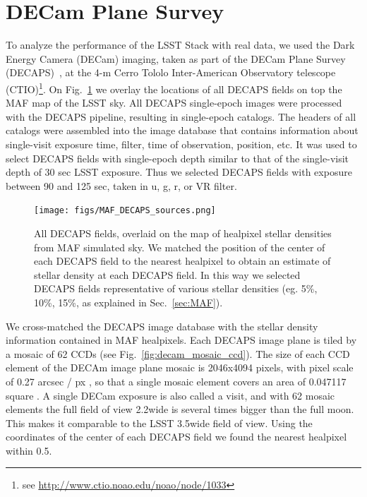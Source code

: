 \documentclass[DM,lsstdraft,toc,usenatbib]{lsstdoc}
\begin{document}
\section{DECam Plane Survey }
\label{sec:DECAPS}
To analyze the performance of the LSST Stack with real data, we used the Dark Energy Camera (DECam) imaging, taken as part of the  DECam Plane Survey (DECAPS)~\cite{schlafly2017}, at the 4-m Cerro Tololo Inter-American Observatory telescope (CTIO)\footnote{see \url{http://www.ctio.noao.edu/noao/node/1033}}. On Fig.~\ref{fig:decaps_fields} we overlay the locations of all DECAPS fields on top  the MAF map of the LSST sky. All DECAPS single-epoch images were processed with the DECAPS pipeline, resulting in single-epoch catalogs.  The headers of all catalogs were assembled into the image database that contains information about single-visit exposure time, filter,  time of observation, position, etc.  It was used to select DECAPS fields with single-epoch depth similar to that of the single-visit depth of 30 sec LSST exposure. Thus we selected DECAPS fields with  exposure between 90  and 125 sec, taken in   u, g, r,  or VR filter. 

\begin{figure}
\texttt{[image: figs/MAF\_DECAPS\_sources.png]}
\caption{All DECAPS fields, overlaid on the map of healpixel stellar densities from MAF simulated sky.  We matched the position of the center of each DECAPS field to the nearest healpixel to obtain an estimate of stellar density at each DECAPS field. In this way we selected DECAPS fields representative of various stellar densities (eg. 5\%, 10\%, 15\%, as explained in Sec.~\ref{sec:MAF}). }
\label{fig:decaps_fields}
\end{figure} 


We cross-matched the DECAPS image database with the  stellar density information contained in MAF healpixels. Each DECAPS image plane is tiled by a mosaic of 62 CCDs (see Fig.~\ref{fig:decam_mosaic_ccd}). The size of each CCD element of the DECAm image plane mosaic is 2046x4094 pixels, with pixel scale of 0.27 arcsec / px , so that a single mosaic element covers an area of 0.047117 square \degree. A single DECam exposure is also called a visit, and with 62 mosaic elements the full field of view  2.2\degree wide is several times bigger than the full moon. This makes it comparable to the LSST 3.5\degree wide field of view.  Using the coordinates of the center of each DECAPS field  we found the nearest healpixel within 0.5\degree . 
\end{document}
